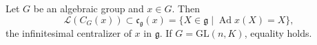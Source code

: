 Let $G$ be an algebraic group and $x \in G$. Then
$$\mathcal{L}(C_G(x)) \subset \mathfrak{c}_{\mathfrak{g}}(x) = \{X \in \mathfrak{g} \mid \operatorname{Ad} x(X) = X\},$$
the infinitesimal centralizer of $x$ in $\mathfrak{g}$. If $G = \mathrm{GL}(n, K)$, equality holds.
